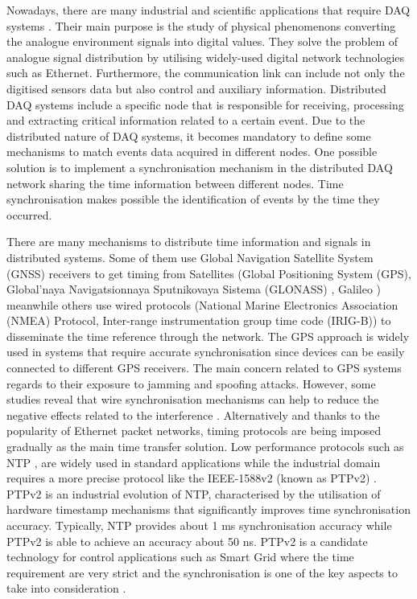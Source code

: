 Nowadays, there are many industrial \cite{daq:res} and scientific applications \cite{daq:sensor-networks} that require DAQ systems \cite{daq:book1}. Their main purpose is the study of physical phenomenons converting the analogue environment signals into digital values. They solve the problem of analogue signal distribution by utilising  widely-used digital network technologies such as Ethernet. Furthermore, the communication link can include not only the digitised sensors data but also control and auxiliary information.
Distributed DAQ systems include a specific node that is responsible for receiving, processing and extracting critical information related to a certain event. Due to the distributed nature of DAQ systems, it becomes mandatory to define some mechanisms to match events data acquired in different nodes. One possible solution is to implement a synchronisation mechanism in the distributed DAQ network sharing the time information between different nodes. Time synchronisation makes possible the identification of events by the time they occurred.

There are many mechanisms to distribute time information and signals in distributed systems. Some of them use Global Navigation Satellite System (GNSS) receivers to get timing from Satellites (Global Positioning System (GPS), Global'naya Navigatsionnaya Sputnikovaya Sistema (GLONASS)  \cite{glonass:website}, Galileo \cite{gsa:galileo}) meanwhile others use wired protocols (National Marine Electronics Association (NMEA) Protocol, Inter-range instrumentation group time code (IRIG-B)) to disseminate the time reference through the network. The GPS approach is widely used in systems that require accurate synchronisation since devices can be easily connected to different GPS receivers. The main concern related to GPS systems regards to their exposure to jamming and spoofing attacks. However, some studies reveal that wire synchronisation mechanisms can help to reduce the negative effects related to the interference \cite{NOURA2016130}. Alternatively and thanks to the popularity of Ethernet packet networks, timing protocols are being imposed gradually as the main time transfer solution. Low performance protocols such as NTP \cite{ntf:ntp_std}, are widely used in standard applications while the industrial domain requires a more precise protocol like the IEEE-1588v2 (known as PTPv2) \cite{ieee:ieee1588_std} \cite{itu:TG8275_1_Y_1369_1}. PTPv2 is an industrial evolution of NTP, characterised by the utilisation of hardware timestamp mechanisms that significantly improves time synchronisation accuracy. Typically, NTP provides about 1 ms synchronisation accuracy while PTPv2 is able to achieve an accuracy about 50 ns. PTPv2 is a candidate technology for control applications such as Smart Grid where the time requirement are very strict and the synchronisation is one of the key aspects to take into consideration \cite{NAFI201623} \cite{COLAK2016396}.

